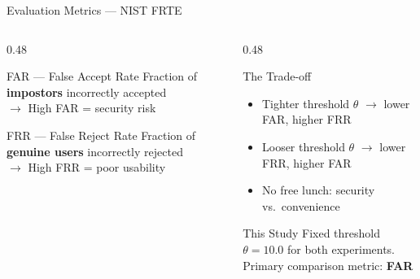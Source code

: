 \documentclass[aspectratio=169]{beamer}
\begin{document}
\begin{frame}{Evaluation Metrics — NIST FRTE}

\begin{columns}[T]
\begin{column}{0.48\textwidth}
    \begin{block}{FAR — False Accept Rate}
        Fraction of \textbf{impostors} incorrectly accepted \\
        \vspace{4pt}
        $\rightarrow$ High FAR = \alert{security risk}
    \end{block}
    \vspace{8pt}
    \begin{block}{FRR — False Reject Rate}
        Fraction of \textbf{genuine users} incorrectly rejected \\
        \vspace{4pt}
        $\rightarrow$ High FRR = \alert{poor usability}
    \end{block}
\end{column}
\begin{column}{0.48\textwidth}
    \begin{block}{The Trade-off}
        \begin{itemize}
            \item Tighter threshold $\theta$ $\rightarrow$ lower FAR, higher FRR
            \item Looser threshold $\theta$ $\rightarrow$ lower FRR, higher FAR
            \item No free lunch: security vs.\ convenience
        \end{itemize}
    \end{block}
    \vspace{8pt}
    \begin{exampleblock}{This Study}
        Fixed threshold $\theta = 10.0$ for both experiments. \\
        Primary comparison metric: \textbf{FAR}
    \end{exampleblock}
\end{column}
\end{columns}

\end{frame}
\end{document}
